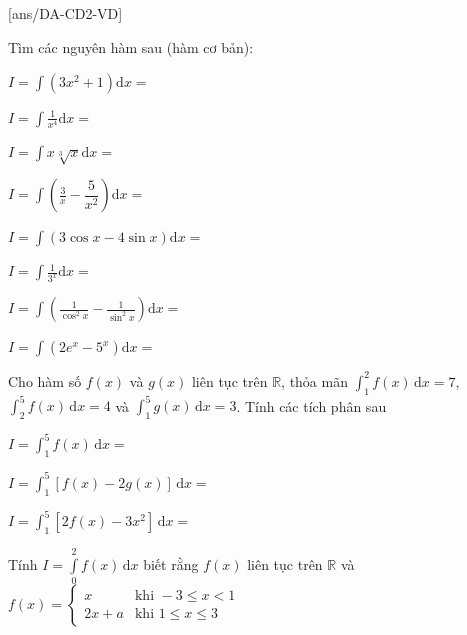 \subsection{\vdmh}
[ans/DA-CD2-VD]
\begin{vd}Tìm các nguyên hàm sau (hàm cơ bản):
 \begin{listEX}[2]
 \item $I= \displaystyle \int (3x^2 + 1) \mathrm{d}x = $\dotfill
 \item $I= \displaystyle \int \frac{1}{x^4} \mathrm{d}x = $\dotfill
 \item $I= \displaystyle \int x\sqrt[3]{x} \mathrm{d}x = $\dotfill
 \item $I= \displaystyle \int \left(\frac{3}{x} - \dfrac{5}{x^2}\right) \mathrm{d}x= $\dotfill
 \item $I = \displaystyle \int (3\cos x - 4\sin x) \mathrm{d}x= $\dotfill
 \item $I= \displaystyle \int \frac{1}{3^x} \mathrm{d}x= $\dotfill
 \item $I= \displaystyle \int \left(\frac{1}{\cos^2 x} - \frac{1}{\sin^2 x}\right) \mathrm{d}x= $\dotfill
 \item $I = \displaystyle \int (2e^x - 5^x) \mathrm{d}x= $\dotfill
 \end{listEX}
\end{vd}
\begin{vd}%
 Cho hàm số $f(x)$ và $g(x)$ liên tục trên $\mathbb{R}$, thỏa mãn $\int_{1}^{2} f(x)\mathrm{\,d}x = 7$, $\int_{2}^{5} f(x)\mathrm{\,d}x = 4$ và $\int_{1}^{5} g(x)\mathrm{\,d}x = 3$. Tính các tích phân sau
 \begin{listEX}[1]
 \item $I = \int_{1}^{5} f(x) \mathrm{\,d}x=$\dotfill
 \item $I = \int_{1}^{5} \left[ f(x) - 2g(x) \right] \mathrm{\,d}x=$\dotfill
 \item $I = \int_{1}^{5} \left[ 2f(x) - 3x^2 \right] \mathrm{\,d}x=$\dotfill
 \end{listEX}
\end{vd}
\begin{vd}
 Tính $I = \displaystyle\int\limits_{0}^{2} f(x)\mathrm{\,d}x$ biết rằng $f(x)$ liên tục trên $\mathbb{R}$ và $f(x) = \begin{cases} x & \text{khi } -3 \le x < 1 \\ 2x + a & \text{khi } 1 \le x \le 3 \end{cases}$
 \loigiai{
 }
\end{vd}

